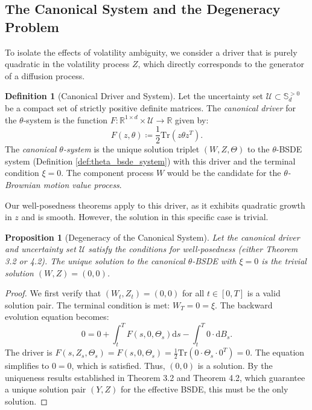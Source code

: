 \documentclass[12pt, letterpaper]{amsart}
\newcommand{\Ucal}{\mathcal{U}}
\newcommand{\Sdp}{\mathbb{S}_d^{>0}}
\newcommand{\R}{\mathbb{R}}
\newcommand{\dd}{\mathrm{d}}
\newcommand{\Tr}{\mathrm{Tr}}
\theoremstyle{plain}
\newtheorem{proposition}[theorem]{Proposition}
\theoremstyle{definition}
\newtheorem{definition}[theorem]{Definition}
\theoremstyle{remark}
\numberwithin{equation}{section} %
\begin{document}
\subsection{The Canonical System and the Degeneracy Problem}
To isolate the effects of volatility ambiguity, we consider a driver that is purely quadratic in the volatility process $Z$, which directly corresponds to the generator of a diffusion process.

\begin{definition}[Canonical Driver and System]
\label{def:canonical_driver_revised}
Let the uncertainty set $\Ucal \subset \Sdp$ be a compact set of strictly positive definite matrices. The \emph{canonical driver} for the $\theta$-system is the function $F: \R^{1\times d} \times \Ucal \to \R$ given by:
\begin{equation}
    F(z, \theta) \coloneqq \frac{1}{2} \Tr(z \theta z^T).
\end{equation}
The \emph{canonical $\theta$-system} is the unique solution triplet $(W, Z, \Theta)$ to the $\theta$-BSDE system (Definition \ref{def:theta_bsde_system}) with this driver and the terminal condition $\xi = 0$. The component process $W$ would be the candidate for the \emph{$\theta$-Brownian motion value process}.
\end{definition}

Our well-posedness theorems apply to this driver, as it exhibits quadratic growth in $z$ and is smooth. However, the solution in this specific case is trivial.

\begin{proposition}[Degeneracy of the Canonical System]
\label{prop:degeneracy_of_canonical_system}
Let the canonical driver and uncertainty set $\Ucal$ satisfy the conditions for well-posedness (either Theorem 3.2 or 4.2). The unique solution to the canonical $\theta$-BSDE with $\xi=0$ is the trivial solution $(W, Z) = (0, 0)$.
\end{proposition}

\begin{proof}
We first verify that $(W_t, Z_t) = (0,0)$ for all $t \in [0,T]$ is a valid solution pair.
The terminal condition is met: $W_T = 0 = \xi$.
The backward evolution equation becomes:
\[ 0 = 0 + \int_t^T F(s, 0, \Theta_s) \dd s - \int_t^T 0 \cdot \dd B_s. \]
The driver is $F(s, Z_s, \Theta_s) = F(s, 0, \Theta_s) = \frac{1}{2}\Tr(0 \cdot \Theta_s \cdot 0^T) = 0$. The equation simplifies to $0=0$, which is satisfied. Thus, $(0,0)$ is a solution.
By the uniqueness results established in Theorem 3.2 and Theorem 4.2, which guarantee a unique solution pair $(Y,Z)$ for the effective BSDE, this must be the only solution.
\end{proof}
\end{document}

